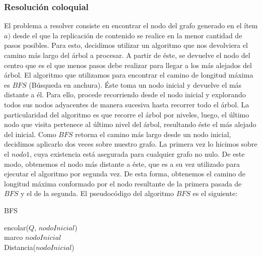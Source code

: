 \begin{itemize}
\subsubsection{Resolución coloquial}
El problema a resolver consiste en encontrar el nodo del grafo generado en el ítem $a)$ desde el que la replicación de contenido se realice en la menor cantidad de pasos posibles. Para esto, decidimos utilizar un algoritmo que nos devolviera el camino más largo del árbol a procesar. A partir de éste, se devuelve el nodo del centro que es el que menos pasos debe realizar para llegar a los más alejados del árbol.\newline
\newline
El algoritmo que utilizamos para encontrar el camino de longitud máxima es $BFS$ (Búsqueda en anchura). Éste toma un nodo inicial y devuelve el más distante a él. Para ello, procede recorriendo desde el nodo inicial y explorando todos sus nodos adyacentes de manera sucesiva hasta recorrer todo el árbol. La particularidad del algoritmo es que recorre el árbol por niveles, luego, el último nodo que visita pertenece al último nivel del árbol, resultando éste el más alejado del inicial.\newline
\newline
Como $BFS$ retorna el camino más largo desde un nodo inicial, decidimos aplicarlo dos veces sobre nuestro grafo. La primera vez lo hicimos sobre el $nodo 1$, cuya existencia está asegurada para cualquier grafo no nulo. De este modo, obtenemos el nodo más distante a éste, que es a su vez utilizado para ejecutar el algoritmo por segunda vez. De esta forma, obtenemos el camino de longitud máxima conformado por el nodo resultante de la primera pasada de $BFS$ y el de la segunda.\newline
\newline
El pseudocódigo del algoritmo $BFS$ es el siguiente:\newline
\newline
\begin{algorithm}[H]
	\SetAlgoLined
	\caption{BFS}
	
    encolar($Q$, $nodoInicial$)\\
    marco $nodoInicial$\\
    Distancia($nodoInicial$) \\
\end{algorithm}
\end{itemize}
